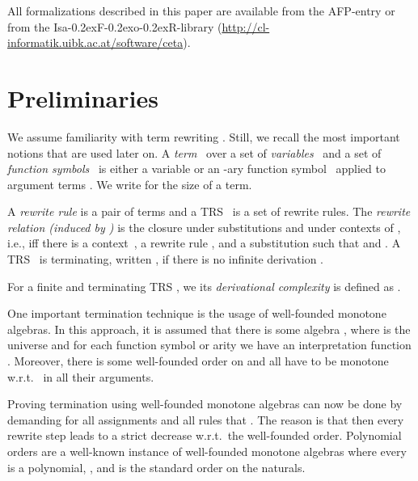 \documentclass[a4paper]{llncs}
\newcommand\isafor{\textsf{Isa\kern-0.2exF\kern-0.2exo\kern-0.2exR}\xspace}
\newcommand\RR{\mathcal{R}}
\begin{document}
All formalizations described in this paper are available from the AFP-entry \cite{matrixAFP} or from the
\isafor-library (\url{http://cl-informatik.uibk.ac.at/software/ceta}).


\section{Preliminaries}
\label{basics}

We assume  familiarity with term rewriting \cite{BN98}. Still, we
recall the most important notions that are used later on. A 
\emph{term}~ over a set of \emph{variables}~ and a set of
\emph{function symbols}~ is
either a variable  or an \mbox{-ary} function symbol~ applied to
 argument terms . We write  for the size of a term.

A \emph{rewrite rule} is a pair of terms
 and a TRS~ is a set of rewrite rules.
The \emph{rewrite relation (induced by )}  is the closure
under substitutions and under contexts of , i.e.,  iff
there is a context~, a rewrite rule , and a substitution
 such that
 and . 
A TRS~ is terminating, written , if there is no
infinite derivation .

\newcommand{\dc}{\mathsf{dc}_\RR}
\newcommand{\tor}{\to_\RR}

For a finite and terminating TRS , we its \emph{derivational 
complexity}  is defined as .

\newcommand{\pl}{\oplus}
\newcommand{\ti}{\odot}
\newcommand{\one}{\underline{\mathsf{1}}}
\newcommand{\zero}{\underline{\mathsf{0}}}
\newcommand{\mono}{\mathsf{mono}}
\newcommand{\pos}{\mathsf{pos}}
\renewcommand{\max}{\mathsf{max}}
\newcommand{\mat}[1]{#1^{n \times n}}
\newcommand{\matsd}[1]{#1_{sd}^{n \times n}}
\newcommand{\A}{{\cal A}}
\newcommand{\sema}[1]{[\![#1]\!]_\alpha}
\newcommand{\semo}[1]{[\![#1]\!]}
\newcommand{\MM}{{\cal M}}
\newcommand{\OO}{{\cal O}}
\newcommand{\norm}[1]{||#1||}

One important termination technique is the usage of
well-founded monotone algebras. In this approach, it is
assumed that there is some algebra ,
where  is the universe and for each function symbol 
 or arity  we have an interpretation 
function . Moreover, there is some well-founded order
 on  and all  have to be monotone w.r.t.~ in all their arguments.

Proving termination using well-founded monotone algebras can now be done
by demanding for all assignments  and all rules
 that . The reason is that then 
every rewrite step  leads to a strict
decrease  w.r.t.\ the well-founded order.
Polynomial orders \cite{CL87,L79} are a well-known instance of well-founded monotone
algebras where every  is
a polynomial, , and  is the standard order on the naturals.
\end{document}
